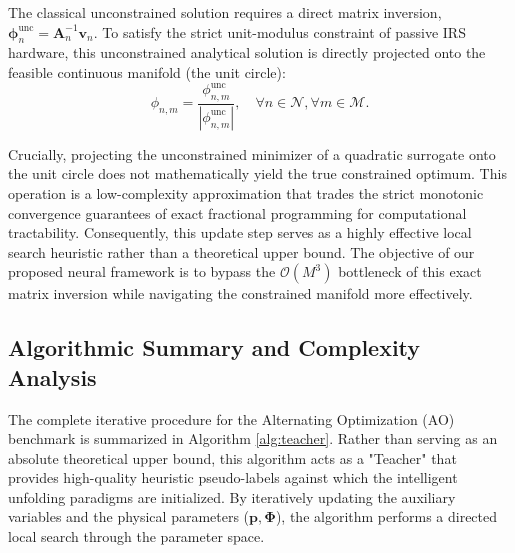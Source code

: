 \documentclass[journal]{IEEEtran}
\begin{document}
The classical unconstrained solution requires a direct matrix inversion, $\boldsymbol{\phi}_n^{\text{unc}} = \mathbf{A}_n^{-1} \mathbf{v}_n$. To satisfy the strict unit-modulus constraint of passive IRS hardware, this unconstrained analytical solution is directly projected onto the feasible continuous manifold (the unit circle):
\begin{equation}
    \phi_{n,m} = \frac{\phi_{n,m}^{\text{unc}}}{|\phi_{n,m}^{\text{unc}}|}, \quad \forall n \in \mathcal{N}, \forall m \in \mathcal{M}.
    \label{eq:projection}
\end{equation}

Crucially, projecting the unconstrained minimizer of a quadratic surrogate onto the unit circle does not mathematically yield the true constrained optimum. This operation is a low-complexity approximation that trades the strict monotonic convergence guarantees of exact fractional programming for computational tractability. Consequently, this update step serves as a highly effective local search heuristic rather than a theoretical upper bound. The objective of our proposed neural framework is to bypass the $\mathcal{O}(M^3)$ bottleneck of this exact matrix inversion while navigating the constrained manifold more effectively.

\subsection{Algorithmic Summary and Complexity Analysis}
\label{subsec:ao_summary}

The complete iterative procedure for the Alternating Optimization (AO) benchmark is summarized in Algorithm \ref{alg:teacher}. Rather than serving as an absolute theoretical upper bound, this algorithm acts as a "Teacher" that provides high-quality heuristic pseudo-labels against which the intelligent unfolding paradigms are initialized. By iteratively updating the auxiliary variables and the physical parameters ($\mathbf{p}, \boldsymbol{\Phi}$), the algorithm performs a directed local search through the parameter space.
\end{document}
